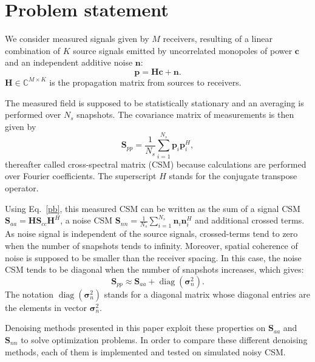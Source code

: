 \documentclass[fontsize=12pt,DIV13,paper=a4,abstract=true,titlepage=false]{scrartcl}
\newcommand{\diag}[1]{\operatorname{diag}\left(#1\right)}
\begin{document}
\section{Problem statement}
We consider measured signals given by $M$ receivers, resulting of a linear combination of $K$ source signals emitted by uncorrelated monopoles of power $\bm{c}$ and an independent additive noise $\bm{n}$:
\begin{equation}
    \bm{p}=\bm{Hc}+\bm{n}.
    \label{pb}
\end{equation}
$\bm{H} \in \mathbb{C}^{M\times K}$ is the propagation matrix from sources to receivers.

The measured field is supposed to be statistically stationary and an averaging is performed over $N_s$ snapshots. The covariance matrix of measurements is then given by 
\begin{equation}
        \bm{S}_{pp} = \frac{1}{N_s}\sum_{i=1}^{N_s}\bm{p}_i\bm{p}^H_i,
        \label{CSM}
\end{equation}
thereafter called cross-spectral matrix (CSM) because calculations are performed over Fourier coefficients. The superscript $H$ stands for the conjugate transpose operator. 

Using Eq.~\eqref{pb}, this measured CSM can be written as the sum of a signal CSM $\bm{S}_{aa}=\bm{HS}_{cc}\bm{H}^H$, a noise CSM $\bm{S}_{nn}= \frac{1}{N_s}\sum_{i=1}^{N_s}\bm{n}_i\bm{n}_i^H$ and additional crossed terms.
As noise signal  is independent of the source signals, crossed-terms tend to zero when the number of snapshots tends to infinity. Moreover, spatial coherence of noise is supposed to be smaller than the receiver spacing. In this case, the noise CSM tends to be diagonal when the number of snapshots increases, which gives:
\begin{equation}
    \bm{S}_{pp}\approx \bm{S}_{aa} + \diag{\bm{\sigma}_n^2}.
\end{equation}
The notation $\diag{\bm{\sigma}_n^2}$ stands for a diagonal matrix whose diagonal entries are the elements in vector $\bm{\sigma}_n^2$.

Denoising methods presented in this paper exploit these properties on $\bm{S}_{aa}$ and $\bm{S}_{nn}$ to solve optimization problems. In order to compare these different denoising methods, each of them is implemented and tested on simulated noisy CSM. 
\end{document}
